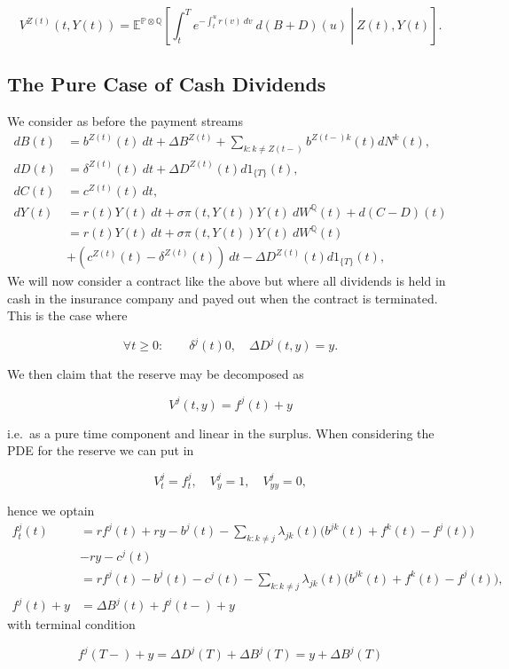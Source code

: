 \documentclass[a4paper,12pt,openany]{book}
\begin{document}
\[
V^{Z(t)}(t,Y(t))=\mathbb E^{\mathbb P\otimes\mathbb Q}\left[\left. \int_t^Te^{-\int_t^u r(v)\ dv}\ d(B+D)(u)\ \right\vert\ Z(t),Y(t)\right].
\]

\hypertarget{the-pure-case-of-cash-dividends}{%
\subsection{The Pure Case of Cash Dividends}\label{the-pure-case-of-cash-dividends}}

We consider as before the payment streams
\begin{align*}
dB(t)&=b^{Z(t)}(t)\ dt + \Delta B^{Z(t)}+\sum_{k:k\ne Z(t-)}b^{Z(t-)k}(t)dN^k(t),\\
dD(t)&=\delta^{Z(t)}(t)\ dt+\Delta D^{Z(t)}(t)d1_{\{T\}}(t),\\
dC(t)&=c^{Z(t)}(t)\ dt,\\
dY(t)&=r(t)Y(t)\ dt + \sigma\pi(t,Y(t)) Y(t)\ dW^\mathbb Q(t) + d(C-D)(t)\\
&=r(t)Y(t)\ dt + \sigma\pi(t,Y(t)) Y(t)\ dW^\mathbb Q(t)\\
&+(c^{Z(t)}(t)-\delta^{Z(t)}(t))\ dt-\Delta D^{Z(t)}(t)d1_{\{T\}}(t),
\end{align*}
We will now consider a contract like the above but where all dividends is held in cash in the insurance company and payed out when the contract is terminated. This is the case where

\[
\forall t\ge 0:\qquad\delta^j(t)0,\quad\Delta D^j(t,y)=y.
\]

We then claim that the reserve may be decomposed as

\[
V^j(t,y)=f^j(t)+y
\]

i.e.~as a pure time component and linear in the surplus. When considering the PDE for the reserve we can put in

\[
V_t^j=f_t^j,\quad V_y^j=1,\quad V_{yy}^j=0,
\]

hence we optain
\begin{align*}
f_t^j(t)&=rf^j(t)+ry-b^j(t)-\sum_{k:k\ne j}\lambda_{jk}(t)\Big(b^{jk}(t)+f^k(t)-f^j(t)\Big)\\
&-ry-c^j(t)\\
&=rf^j(t)-b^j(t)-c^j(t)-\sum_{k:k\ne j}\lambda_{jk}(t)\Big(b^{jk}(t)+f^k(t)-f^j(t)\Big),\\
f^j(t)+y&=\Delta B^j(t)+f^j(t-)+y
\end{align*}
with terminal condition

\[
f^j(T-)+y=\Delta D^j(T)+\Delta B^j(T)=y+\Delta B^j(T)
\]
\end{document}
